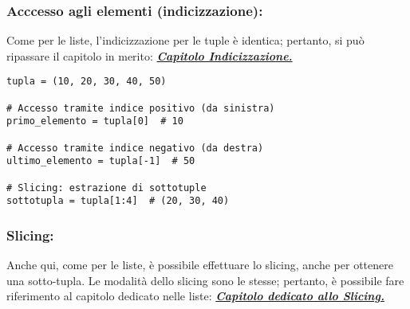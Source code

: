 \subsubsection{{Acccesso agli elementi (indicizzazione):}}\label{TupleIndicizzazione}

Come per le liste, l'indicizzazione per le tuple è identica; pertanto, si può ripassare il capitolo in merito: \hyperref[IndicizzazioneListe]{\textit{{\textbf{Capitolo Indicizzazione.}}}}


\vspace{0,5cm}
\begin{lstlisting}
tupla = (10, 20, 30, 40, 50)

# Accesso tramite indice positivo (da sinistra)
primo_elemento = tupla[0]  # 10

# Accesso tramite indice negativo (da destra)
ultimo_elemento = tupla[-1]  # 50

# Slicing: estrazione di sottotuple
sottotupla = tupla[1:4]  # (20, 30, 40)
\end{lstlisting}



\vspace{0,5cm}

\subsubsection{{Slicing:}}\label{SlicingTuple}

Anche qui, come per le liste, è possibile effettuare lo slicing, anche per ottenere una sotto-tupla. Le modalità dello slicing sono le stesse; pertanto, è possibile fare riferimento al capitolo dedicato nelle liste: \hyperref[SlicingListe]{\textit{\textbf{Capitolo dedicato allo Slicing.}}}

